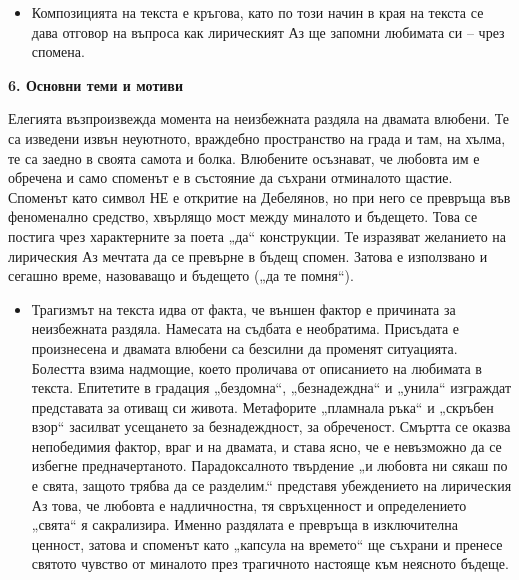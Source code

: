 \documentclass[12pt,a4paper]{article}
\begin{document}
\begin{itemize}[leftmargin=*]
\vspace{-0.2cm}
\item Композицията на текста е \colorbox{yellow!40}{кръгова}, като по този начин в края на текста се дава отговор на въпроса как лирическият Аз ще запомни любимата си – чрез спомена.
\end{itemize}

\vspace{0.1cm}
 
\noindent 
\textbf{6. Основни теми и мотиви}
\vspace{0.1cm}
  
\indent Елегията възпроизвежда момента на неизбежната раздяла на двамата влюбени. Те са изведени извън неуютното, враждебно пространство на града и там, на хълма, те са заедно в своята самота и болка. Влюбените осъзнават, че любовта им е обречена и само споменът е в състояние да съхрани отминалото щастие. Споменът като символ НЕ е откритие на Дебелянов, но при него се превръща във феноменално средство, хвърлящо мост между миналото и бъдещето. Това се постига чрез характерните за поета „да“ конструкции. Те изразяват желанието на лирическия Аз мечтата да се превърне в бъдещ спомен. Затова е използвано и сегашно време, назоваващо и бъдещето („да те помня“).

\begin{itemize}[leftmargin=*]
\vspace{-0.2cm}
\item Трагизмът на текста идва от факта, че външен фактор е причината за неизбежната раздяла. Намесата на съдбата е необратима. Присъдата е произнесена и двамата влюбени са безсилни да променят ситуацията. Болестта взима надмощие, което проличава от описанието на любимата в текста. Епитетите в градация „бездомна“, „безнадеждна“ и „унила“ изграждат представата за отиващ си живота. Метафорите „пламнала ръка“ и „скръбен взор“ засилват усещането за безнадеждност, за обреченост. Смъртта се оказва непобедимия фактор, враг и на двамата, и става ясно, че е невъзможно да се избегне предначертаното. Парадоксалното твърдение „и любовта ни сякаш по е свята, защото трябва да се разделим.“ представя убеждението на лирическия Аз това, че любовта е надличностна, тя свръхценност и определението „свята“ я сакрализира. Именно раздялата е превръща в изключителна ценност, затова и споменът като „капсула на времето“ ще съхрани и пренесе святото чувство от миналото през трагичното настояще към неясното бъдеще.
\end{itemize}
\end{document}
